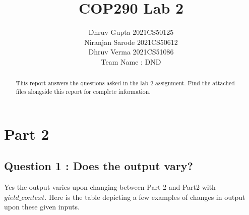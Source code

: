 \documentclass{article}
\title{COP290 Lab 2}
\author{Dhruv Gupta 2021CS50125 \\  Niranjan Sarode 2021CS50612\\ Dhruv Verma 2021CS51086 \\ Team Name : DND}
\date{}
\begin{document}
\maketitle

\begin{abstract}
This report answers the questions asked in the lab 2 assignment. Find the attached files alongside this report for complete information.
\end{abstract}

\section*{Part 2}
\subsection*{Question 1 : Does the output vary?}
Yes the output varies upon changing between Part 2 and Part2 with $yield\_context$.
Here is the table depicting a few examples of changes in output upon these given inputs.
\end{document}
